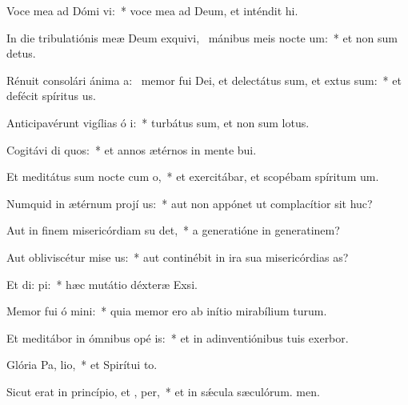 \item Voce mea ad Dómi vi:~* voce mea ad Deum, et inténdit hi.
\item In die tribulatiónis meæ Deum exquivi,~\pscross{} mánibus meis nocte  um:~* et non sum detus.
\item Rénuit consolári ánima a:~\pscross{} memor fui Dei, et delectátus sum, et extus sum:~* et defécit spíritus us.
\item Anticipavérunt vigílias ó i:~* turbátus sum, et non sum lotus.
\item Cogitávi di quos:~* et annos ætérnos in mente bui.
\item Et meditátus sum nocte cum  o,~* et exercitábar, et scopébam spíritum um.
\item Numquid in ætérnum projí us:~* aut non appónet ut complacítior sit huc?
\item Aut in finem misericórdiam su det,~* a generatióne in generatinem?
\item Aut obliviscétur mise us:~* aut continébit in ira sua misericórdias as?
\item Et di:  pi:~* hæc mutátio déxteræ Exsi.
\item Memor fui ó mini:~* quia memor ero ab inítio mirabílium turum.
\item Et meditábor in ómnibus opé is:~* et in adinventiónibus tuis exerbor.
\item Glória Pa,  lio,~* et Spirítui to.
\item Sicut erat in princípio, et ,  per,~* et in sǽcula sæculórum. men.

